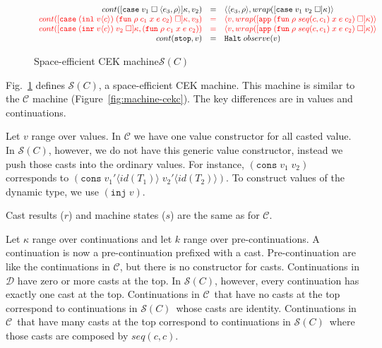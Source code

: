 \documentclass[acmsmall,review,anonymous]{acmart}\settopmatter{printfolios=true,printccs=false,printacmref=false}
\newcommand{\figref}[1]{Fig.~\ref{#1}}
\newcommand{\funrule}[3]{#1 &=& #2 & #3\\}
\newcommand{\hifunrule}[3]{\highlight{#1} &\highlight{=}& \highlight{#2} & 
\highlight{#3}\\}
\newcommand{\sOOinspect}[3]{\langle\langle#1,#2\rangle,#3\rangle}
\newcommand{\sOOreturn}[2]{\langle#1,#2\rangle}
\newcommand{\sOOhalt}[1]{\mathtt{Halt} \; #1}
\newcommand{\vOOcons}[2]{\mathtt{cons}\;#1\;#2}
\newcommand{\kOOmt}[0]{\mathtt{stop}}
\newcommand{\kOOappII}[2]{
	[\mathtt{app} \; #1 \; \square]#2}
\newcommand{\kOOcaseII}[4]{
	[\mathtt{case} \; #1 \; \square \; \langle#2,#3\rangle ]#4}
\newcommand{\kOOcaseIII}[3]{
	[\mathtt{case} \; #1 \; #2 \; \square]#3}
\newcommand{\hcvOOinj}[2]{\mathtt{inj} \; #2}
\newcommand{\hcvOOfun}[5]{\mathtt{fun} \; #2 \; #1 \; #3 \; #4 \; #5}
\newcommand{\hcvOOcons}[4]{\mathtt{cons}\;#1\langle#2\rangle\;#3\langle#4\rangle}
\newcommand{\hcvOOinl}[2]{\mathtt{inl}\;#1\langle#2\rangle}
\newcommand{\hcvOOinr}[2]{\mathtt{inr}\;#1\langle#2\rangle}
\newcommand{\hckOOmt}[0]{\mathtt{stop}}
\newcommand{\judgeSreduceTrans}[3]{#2 \longmapsto_{\mathcal{S}(#1)}^{*} #3}
\newcommand{\judgeSeval}[3]{eval_{\mathcal{S}(#1)}(#2) = #3}
\newcommand{\ineffCEK}{$\mathcal{C}$}
\newcommand{\ineffCEKD}{$\mathcal{D}$}
\newcommand{\effCEK}[1]{$\mathcal{S}(#1)$}
\newcommand{\continue}[2]{cont(#2,#1)}
\newcommand{\highlight}[1]{{\color{red} #1}}
\begin{document}
\begin{figure}
\[\begin{array}{rclr}
\funrule{
	\continue{v_2}{
		\kOOcaseII{v_1}{e_3}{\rho}{\kappa}
	}
}{
	\sOOinspect{e_3}{\rho}{
	wrap(\kOOcaseIII{v_1}{v_2}{\kappa})
	}
}{}

\hifunrule{
	\continue{v_3}{
		\kOOcaseIII{(\hcvOOinl{v}{c})}{(\hcvOOfun{c_1}{\rho}{x}{e}{c_2})}{\kappa}
	}
}{
	\sOOreturn{v}{wrap(\kOOappII{(\hcvOOfun{seq(c,c_1)}{\rho}{x}{e}{c_2})}{\kappa})}
}{}

\hifunrule{
	\continue{(\hcvOOfun{c_1}{\rho}{x}{e}{c_2})}
	{
		\kOOcaseIII{(\hcvOOinr{v}{c})}{v_2}{\kappa}
	}
}{
	\sOOreturn{v}{wrap(\kOOappII{(\hcvOOfun{seq(c,c_1)}{\rho}{x}{e}{c_2})}{\kappa})}
}{}

\funrule{
	\continue{v}{\kOOmt}}{
	\sOOhalt{observe(v)}}{}
	
	\end{array}\]
	
	
	
	\caption{Space-efficient CEK machine$\mathcal{S}(C)$}
	\label{fig:machine-cekcc}
\end{figure}

\figref{fig:machine-cekcc} defines \effCEK{C}, a space-efficient CEK
machine.  This machine is similar to the \ineffCEK{} machine
(Figure~\ref{fig:machine-cekc}).  The key differences are in values
and continuations.

Let $v$ range over values. In \ineffCEK{} we have one value
constructor for all casted value.  In \effCEK{C}, however, we do not
have this generic value constructor, instead we push those casts into
the ordinary values. For instance, $(\vOOcons{v_1}{v_2})$ corresponds
to $(\hcvOOcons{v_1'}{id(T_1)}{v_2'}{id(T_2)})$. To construct values
of the dynamic type, we use $(\hcvOOinj{P}{v})$.

Cast results ($r$) and machine states ($s$) are the same as for
\ineffCEK{}.

Let $\kappa$ range over continuations and let $k$ range over
pre-continuations.  A continuation is now a pre-continuation prefixed
with a cast.  Pre-continuation are like the continuations in
\ineffCEK{}, but there is no constructor for casts.  Continuations in
\ineffCEKD{} have zero or more casts at the top.  In \effCEK{C},
however, every continuation has exactly one cast at the top.
Continuations in \ineffCEK\ that have no casts at the top correspond
to continuations in \effCEK{C}\ whose casts are identity.
Continuations in \ineffCEK\ that have many casts at the top correspond
to continuations in \effCEK{C}\ where those casts are composed by
$seq(c,c)$.
\end{document}
